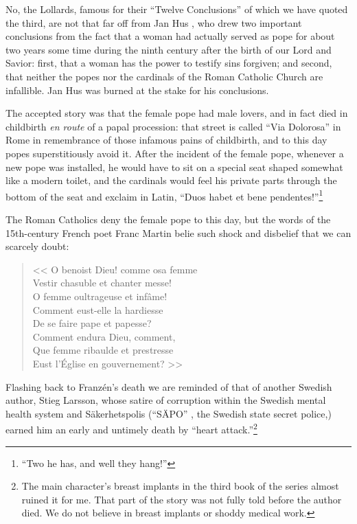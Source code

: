 \documentclass[letterpaper]{article}
\begin{document}
No, the Lollards, famous for their ``Twelve Conclusions'' of which we have quoted the third, are not that far off from Jan Hus \cite{huss1915church}, who drew two important conclusions from the fact that a woman had actually served as pope for about two years some time during the ninth century after the birth of our Lord and Savior:  first, that a woman has the power to testify sins forgiven; and second, that neither the popes nor the cardinals of the Roman Catholic Church are infallible.  Jan Hus was burned at the stake for his conclusions.

The accepted story was that the female pope had male lovers, and in fact died in childbirth \foreignlanguage{french}{\textit{en route}} of a papal procession: that street is called ``Via Dolorosa'' in Rome in remembrance of those infamous pains of childbirth, and to this day popes superstitiously avoid it.  After the incident of the female pope, whenever a new pope was installed, he would have to sit on a special seat shaped somewhat like a modern toilet, and the cardinals would feel his private parts through the bottom of the seat and exclaim in Latin, ``\foreignlanguage{latin}{Duos habet et bene pendentes!}''\footnote{``Two he has, and well they hang!''}

The Roman Catholics deny the female pope to this day, but the words of the 15th-century French poet Franc Martin \cite{bayle1820} belie such shock and disbelief that we can scarcely doubt:
\begin{verse}\foreignlanguage{french}{
	<< O benoist Dieu! comme osa femme\\
	\noindent Vestir chasuble et chanter messe!\\
	\noindent O femme oultrageuse et infâme!\\
	\noindent Comment eust-elle la hardiesse\\
	\noindent De se faire pape et papesse?\\
	\noindent Comment endura Dieu, comment,\\
	\noindent Que femme ribaulde et prestresse\\
	\noindent Eust l'Église en gouvernement? >>
}\end{verse}

Flashing back to Franz{\'e}n's death we are reminded of that of another Swedish author, Stieg Larsson, whose satire \cite{larsson2005,larsson2006,larsson2007} of corruption within the Swedish mental health system and S{\"a}kerhetspolis (``S{\"A}PO'' \cite{sapo}, the Swedish state secret police,) earned him an early and untimely death by ``heart attack.''\footnote{The main character's breast implants in the third book of the series almost ruined it for me.  That part of the story was not fully told before the author died.  We do not believe in breast implants or shoddy medical work.}
\end{document}
